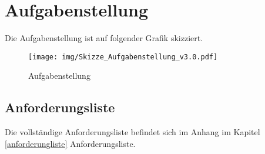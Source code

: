 \section{Aufgabenstellung}

Die Aufgabenstellung ist auf folgender Grafik skizziert.

\begin{figure}[H]
\centering
\texttt{[image: img/Skizze\_Aufgabenstellung\_v3.0.pdf]}
\caption{Aufgabenstellung}
\label{fig:aufgebanstellung}
\end{figure}

\subsection{Anforderungsliste}

Die vollständige Anforderungsliste befindet sich im Anhang im Kapitel \ref{anforderungliste} Anforderungsliste.